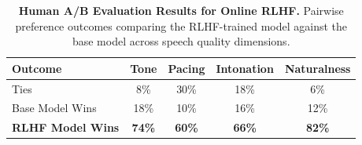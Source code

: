 \begin{table}[!t]
\centering
\footnotesize
\captionsetup{font=small}
\caption{\textbf{Human A/B Evaluation Results for Online RLHF.} Pairwise preference outcomes comparing the RLHF-trained model against the base model across speech quality dimensions.}
\vspace{-0.5em}
\setlength{\tabcolsep}{3.3pt}
\begin{tabular}{l c c c c}
\toprule[1.5pt]
\textbf{Outcome} 
& \textbf{Tone} 
& \textbf{Pacing} 
& \textbf{Intonation} 
& \textbf{Naturalness} \\
\midrule
Ties 
& 8\%  & 30\% & 18\%  & 6\%  \\
Base Model Wins 
& 18\%  & 10\%  & 16\%  & 12\%  \\
\textbf{RLHF Model Wins} 
& \textbf{74\%} & \textbf{60\%} & \textbf{66\%} & \textbf{82\%} \\
\bottomrule
\end{tabular}
\label{table:rlhf-results}
\vspace{-1em}
\end{table}